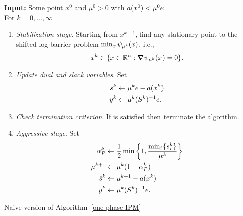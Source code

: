 \documentclass{article}
\begin{document}
\begin{algorithm}[H]
\textbf{Input:} Some point $x^{0}$ and $\mu^{0} > 0$ with $a(x^{0}) < \mu^{0} e$ \\

For $k = 0, \dots, \infty$
\begin{enumerate}[label*=A.{\arabic*}]
\item \label{stabilization-stage} \emph{Stabilization stage}. Starting from $x^{k-1}$, find any stationary point to the shifted log barrier problem $\min_{x} \psi_{\mu^{k}}(x)$, i.e.,
$$
x^{k} \in \{ x \in \mathbb{R}^{n} : \grad \psi_{\mu^{k}}(x) = 0 \}.
$$
\item \emph{Update dual and slack variables}. Set 
\begin{subequations}
\begin{flalign}
s^{k} &\gets \mu^{k} e - a(x^{k}) \label{naive:stb:s} \\
y^{k} &\gets \mu^{k} (S^{k})^{-1} e. \label{naive:stb:y}
\end{flalign}
\end{subequations}

\item \emph{Check termination criterion}. If \termination{} is satisfied then terminate the algorithm.
\item \label{agg-stage} \emph{Aggressive stage}. Set
\begin{subequations}
\begin{flalign}
\alpha^k_{P} &\gets \frac{1}{2} \min\left\{ 1, \frac{\min_i\{ s_i^{k} \}}{\mu^k} \right\} \label{naive:agg:alpha} \\
\mu^{k+1} &\gets \mu^{k} (1 - \alpha^k_{P} )  \label{naive:agg:mu} \\
\bar{s}^{k} &\gets \mu^{k+1} - a(x^{k})  \label{naive:agg:s} \\
\bar{y}^{k} &\gets \bar{\mu}^{k} (\bar{S}^{k})^{-1} e. \label{naive:agg:y}
\end{flalign}
\end{subequations}
\end{enumerate}
\caption{Naive version of Algorithm~\ref{one-phase-IPM}}\label{alg:naive}
\end{algorithm}

\end{document}
